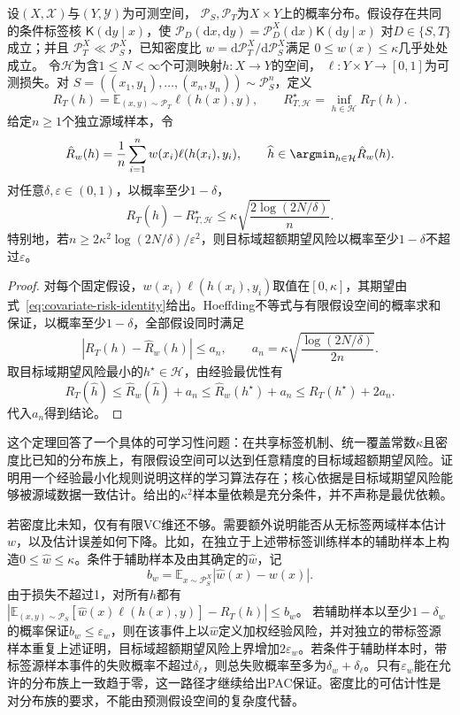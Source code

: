 \begin{theorem}[已知密度比下的迁移样本量界]
\label{thm:covariate-finite-pac}
设$(X,\mathcal X)$与$(Y,\mathcal Y)$为可测空间，
$\mathcal P_S,\mathcal P_T$为$X\times Y$上的概率分布。假设存在共同的条件标签核
$\mathsf K(\mathrm dy\mid x)$，使
$\mathcal P_D(\mathrm dx,\mathrm dy)
=\mathcal P_D^X(\mathrm dx)\mathsf K(\mathrm dy\mid x)$
对$D\in\{S,T\}$成立；并且
$\mathcal P_T^X\ll\mathcal P_S^X$，已知密度比
$w=\mathrm d\mathcal P_T^X/\mathrm d\mathcal P_S^X$满足
$0\leq w(x)\leq\kappa$几乎处处成立。
令$\mathcal H$为含$1\leq N<\infty$个可测映射$h:X\to Y$的空间，
$\ell:Y\times Y\to[0,1]$为可测损失。对
$S=((x_1,y_1),\ldots,(x_n,y_n))\sim\mathcal P_S^n$，定义
\[
 R_T(h)=\mathbb E_{(x,y)\sim\mathcal P_T}\ell(h(x),y),\qquad
 R_{T,\mathcal H}^{\star}=\inf_{h\in\mathcal H}R_T(h).
\]
给定$n\geq1$个独立源域样本，令
\[
 \hat R_w(h)=\frac1n\sum_{i=1}^n
          w(x_i)\ell(h(x_i),y_i),\qquad
 \widehat h\in\argmin_{h\in\mathcal H}\hat R_w(h).
\]
对任意$\delta,\varepsilon\in(0,1)$，以概率至少$1-\delta$，
\begin{equation}
 R_T(\widehat h)-R_{T,\mathcal H}^{\star}
 \leq\kappa\sqrt{\frac{2\log(2N/\delta)}{n}}.
 \label{eq:covariate-finite-excess}
\end{equation}
特别地，若$n\geq2\kappa^2\log(2N/\delta)/\varepsilon^2$，则目标域超额期望风险以概率至少$1-\delta$不超过$\varepsilon$。
\end{theorem}
\begin{proof}
对每个固定假设，$w(x_i)\ell(h(x_i),y_i)$取值在$[0,\kappa]$，其期望由式~\eqref{eq:covariate-risk-identity}给出。Hoeffding不等式与有限假设空间的概率求和保证，以概率至少$1-\delta$，全部假设同时满足
\[
 |R_T(h)-\hat R_w(h)|\leq
 a_n,\qquad a_n=\kappa\sqrt{\frac{\log(2N/\delta)}{2n}}.
\]
取目标域期望风险最小的$h^\star\in\mathcal H$，由经验最优性有
\[
 R_T(\widehat h)
 \leq\hat R_w(\widehat h)+a_n
 \leq\hat R_w(h^\star)+a_n
 \leq R_T(h^\star)+2a_n.
\]
代入$a_n$得到结论。
\end{proof}

这个定理回答了一个具体的可学习性问题：在共享标签机制、统一覆盖常数$\kappa$且密度比已知的分布族上，有限假设空间可以达到任意精度的目标域超额期望风险。证明用一个经验最小化规则说明这样的学习算法存在；核心依据是目标域期望风险能够被源域数据一致估计。给出的$\kappa^2$样本量依赖是充分条件，并不声称是最优依赖。

若密度比未知，仅有有限VC维还不够。需要额外说明能否从无标签两域样本估计$w$，以及估计误差如何下降。比如，在独立于上述带标签训练样本的辅助样本上构造$0\leq\widehat w\leq\kappa$。条件于辅助样本及由其确定的$\widehat w$，记
\[
 b_w=\mathbb E_{x\sim\mathcal P_S^X}|\widehat w(x)-w(x)|.
\]
由于损失不超过1，对所有$h$都有
$|\mathbb E_{(x,y)\sim\mathcal P_S}[\widehat w(x)\ell(h(x),y)]-R_T(h)|\leq b_w$。
若辅助样本以至少$1-\delta_w$的概率保证$b_w\leq\varepsilon_w$，则在该事件上以$\widehat w$定义加权经验风险，并对独立的带标签源样本重复上述证明，目标域超额期望风险上界增加$2\varepsilon_w$。若条件于辅助样本时，带标签源样本事件的失败概率不超过$\delta_\ell$，则总失败概率至多为$\delta_w+\delta_\ell$。只有$\varepsilon_w$能在允许的分布族上一致趋于零，这一路径才继续给出PAC保证。密度比的可估计性是对分布族的要求，不能由预测假设空间的复杂度代替。

